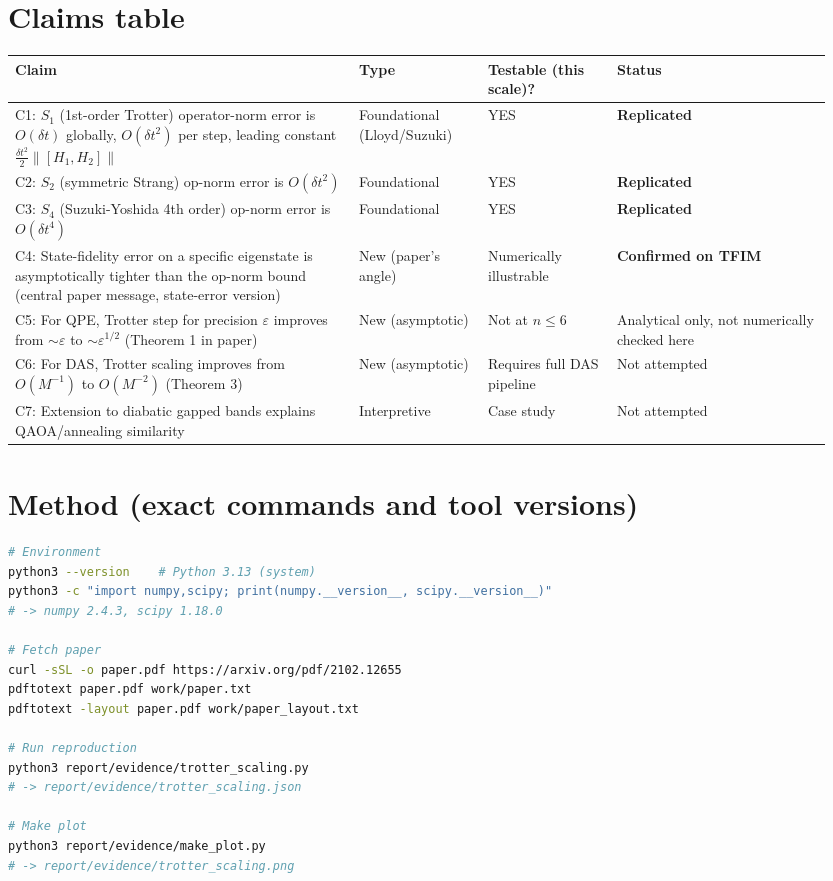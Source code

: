 \documentclass[11pt]{article}
\begin{document}
\section{Claims table}
\begin{center}
\begin{tabular}{@{}p{0.4\linewidth}p{0.15\linewidth}p{0.15\linewidth}p{0.25\linewidth}@{}}
\toprule
Claim & Type & Testable (this scale)? & Status \\
\midrule
C1: $S_1$ (1st-order Trotter) operator-norm error is $O(\delta t)$ globally, $O(\delta t^2)$ per step, leading constant $\tfrac{\delta t^2}{2}\|[H_1,H_2]\|$
& Foundational (Lloyd/Suzuki) & YES & \textbf{Replicated} \\
C2: $S_2$ (symmetric Strang) op-norm error is $O(\delta t^2)$
& Foundational & YES & \textbf{Replicated} \\
C3: $S_4$ (Suzuki-Yoshida 4th order) op-norm error is $O(\delta t^4)$
& Foundational & YES & \textbf{Replicated} \\
C4: State-fidelity error on a specific eigenstate is asymptotically tighter than the op-norm bound (central paper message, state-error version)
& New (paper's angle) & Numerically illustrable & \textbf{Confirmed on TFIM} \\
C5: For QPE, Trotter step for precision $\varepsilon$ improves from $\sim\varepsilon$ to $\sim\varepsilon^{1/2}$ (Theorem 1 in paper)
& New (asymptotic) & Not at $n\!\le\!6$ & Analytical only, not numerically checked here \\
C6: For DAS, Trotter scaling improves from $O(M^{-1})$ to $O(M^{-2})$ (Theorem 3)
& New (asymptotic) & Requires full DAS pipeline & Not attempted \\
C7: Extension to diabatic gapped bands explains QAOA/annealing similarity
& Interpretive & Case study & Not attempted \\
\bottomrule
\end{tabular}
\end{center}

\section{Method (exact commands and tool versions)}
\begin{lstlisting}[language=bash]
# Environment
python3 --version    # Python 3.13 (system)
python3 -c "import numpy,scipy; print(numpy.__version__, scipy.__version__)"
# -> numpy 2.4.3, scipy 1.18.0

# Fetch paper
curl -sSL -o paper.pdf https://arxiv.org/pdf/2102.12655
pdftotext paper.pdf work/paper.txt
pdftotext -layout paper.pdf work/paper_layout.txt

# Run reproduction
python3 report/evidence/trotter_scaling.py
# -> report/evidence/trotter_scaling.json

# Make plot
python3 report/evidence/make_plot.py
# -> report/evidence/trotter_scaling.png
\end{lstlisting}
\end{document}

